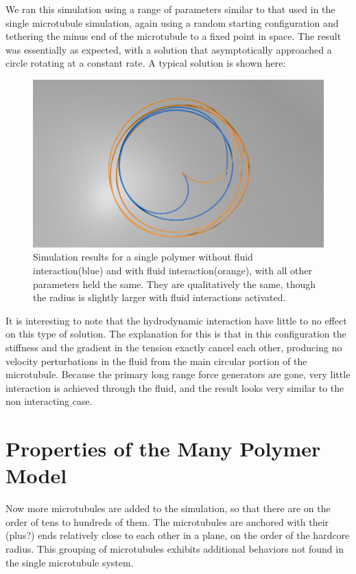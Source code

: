 \documentclass[11pt]{ucthesis}
\begin{document}
We ran this simulation using a range of parameters similar to that used in the single microtubule simulation, again using a random starting configuration and tethering the minus end of the microtubule to a fixed point in space. 
The result was essentially as expected, with a solution that asymptotically approached a circle rotating at a constant rate. A typical solution is shown here:

\begin{figure}[htp]
\begin{center}
\includegraphics[width=\hsize]{singtest.png}
\caption{ 
Simulation results for a single polymer without fluid interaction(blue) and with fluid interaction(orange), with all other parameters held the same. They are qualitatively the same, though the radius is slightly larger with fluid interactions activated.
}
\label{fig:singtest}
\end{center}
\end{figure}

It is interesting to note that the hydrodynamic interaction have little to no effect on this type of solution. 
The explanation for this is that in this configuration the stiffness and the gradient in the tension exactly cancel each other, producing no velocity perturbations in the fluid from the main circular portion of the microtubule.
Because the primary long range force generators are gone, very little interaction is achieved through the fluid, and the result looks very similar to the non interacting case.

\section{Properties of the Many Polymer Model}

Now more microtubules are added to the simulation, so that there are on the order of tens to hundreds of them.
The microtubules are anchored with their (plus?) ends relatively close to each other in a plane, on the order of the hardcore radius. 
This grouping of microtubules exhibits additional behaviors not found in the single microtubule system.
\end{document}
